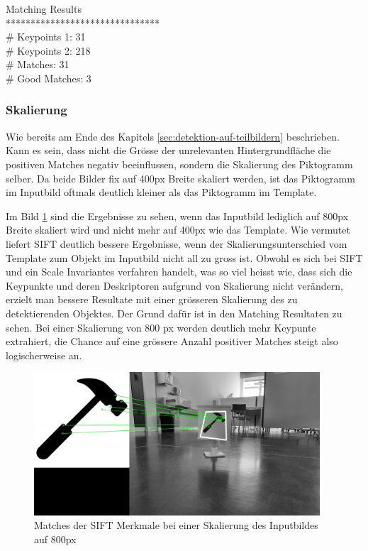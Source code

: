 Matching Results\\
*******************************\\
\# Keypoints 1:                           31\\
\# Keypoints 2:                           218\\
\# Matches:                               31\\
\# Good Matches:                          3\\

\subsubsection{Skalierung}
Wie bereits am Ende des Kapitels \ref{sec:detektion-auf-teilbildern} beschrieben. Kann es sein, dass nicht die Grösse der unrelevanten Hintergrundfläche die positiven Matches negativ beeinflussen, sondern die Skalierung des Piktogramm selber. Da beide Bilder fix auf 400px Breite skaliert werden, ist das Piktogramm im Inputbild oftmals deutlich kleiner als das Piktogramm im Template. 

Im Bild \ref{fig:sift-matches-800} sind die Ergebnisse zu sehen, wenn das Inputbild lediglich auf 800px Breite skaliert wird und nicht mehr auf 400px wie das Template. Wie vermutet liefert SIFT deutlich bessere Ergebnisse, wenn der Skalierungsunterschied vom Template zum Objekt im Inputbild nicht all zu gross ist. Obwohl es sich bei SIFT und ein Scale Invariantes verfahren handelt, was so viel heisst wie, dass sich die Keypunkte und deren Deskriptoren aufgrund von Skalierung nicht verändern, erzielt man bessere Resultate mit einer grösseren Skalierung des zu detektierenden Objektes. Der Grund dafür ist in den Matching Resultaten zu sehen. Bei einer Skalierung von 800 px werden deutlich mehr Keypunte extrahiert, die Chance auf eine grössere Anzahl positiver Matches steigt also logischerweise an.

\begin{figure}[H]
  \includegraphics[width=0.95\textwidth]{img/piktogrammerkennung/sift_matches_800.jpg}
  \centering
  \caption{Matches der SIFT Merkmale bei einer Skalierung des Inputbildes auf 800px}
  \label{fig:sift-matches-800}
\end{figure}


